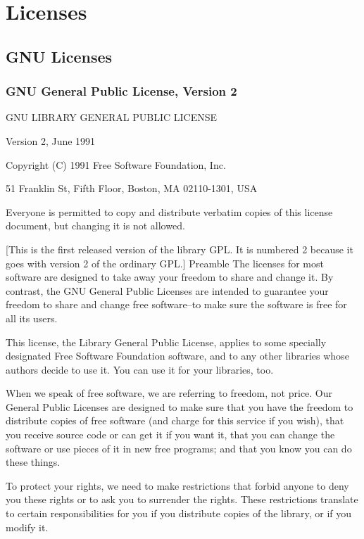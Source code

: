 \small
\chapter{Licenses} %
\section{GNU Licenses}



\subsection{GNU General Public License, Version 2}
\label{GPLv2}
\begin{center}
	GNU LIBRARY GENERAL PUBLIC LICENSE
	
	Version 2, June 1991 
\end{center}


\noindent Copyright (C) 1991 Free Software Foundation, Inc.

51 Franklin St, Fifth Floor, Boston, MA  02110-1301, USA


Everyone is permitted to copy and distribute verbatim copies
of this license document, but changing it is not allowed.

[This is the first released version of the library GPL.  It is
numbered 2 because it goes with version 2 of the ordinary GPL.]
Preamble
The licenses for most software are designed to take away your freedom to share and change it. By contrast, the GNU General Public Licenses are intended to guarantee your freedom to share and change free software--to make sure the software is free for all its users. 

This license, the Library General Public License, applies to some specially designated Free Software Foundation software, and to any other libraries whose authors decide to use it. You can use it for your libraries, too. 

When we speak of free software, we are referring to freedom, not price. Our General Public Licenses are designed to make sure that you have the freedom to distribute copies of free software (and charge for this service if you wish), that you receive source code or can get it if you want it, that you can change the software or use pieces of it in new free programs; and that you know you can do these things. 

To protect your rights, we need to make restrictions that forbid anyone to deny you these rights or to ask you to surrender the rights. These restrictions translate to certain responsibilities for you if you distribute copies of the library, or if you modify it. 

